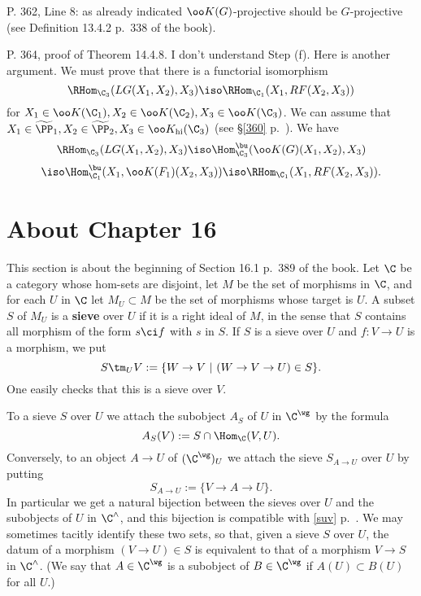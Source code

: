 \documentclass[12pt]{article}
\theoremstyle{remark}
\theoremstyle{definition}
\begin{document}
%

\begin{s}
P. 362, Line 8: as already indicated $\oo K(G)$-projective should be $G$-projective (see Definition 13.4.2 p.~338 of the book).
\end{s}

%

\begin{s}
P. 364, proof of Theorem 14.4.8. I don't understand Step (f). Here is another argument. We must prove that there is a functorial isomorphism
$$
\RHom_{\C_3}(LG(X_1,X_2),X_3)\iso\RHom_{\C_1}(X_1,RF(X_2,X_3))
$$ 
for $X_1\in\oo K(\C_1),X_2\in\oo K(\C_2),X_3\in\oo K(\C_3)$. We can assume that $X_1\in\widetilde\PP_1,X_2\in\widetilde\PP_2,X_3\in\oo K_{\text{hi}}(\C_3)$ (see \S\ref{360} p.~). We have 
$$
\RHom_{\C_3}(LG(X_1,X_2),X_3)\iso\Hom^\bu_{\C_3}(\oo K(G)(X_1,X_2),X_3)
$$ 
$$
\iso\Hom^\bu_{\C_1}(X_1,\oo K(F_1)(X_2,X_3))\iso\RHom_{\C_1}(X_1,RF(X_2,X_3)).
$$
\end{s}


\section{About Chapter 16}


This section is about the beginning of Section 16.1 p.~389 of the book. Let $\C$ be a category whose hom-sets are disjoint, let $M$ be the set of morphisms in $\C$, and for each $U$ in $\C$ let $M_U\subset M$ be the set of morphisms whose target is $U$. A subset $S$ of $M_U$ is a \textbf{sieve}  over $U$ if it is a right ideal of $M$, in the sense that $S$ contains all morphism of the form $s\ci f$ with $s$ in $S$. If $S$ is a sieve over $U$ and $f:V\to U$ is a morphism, we put
\begin{equation}\label{suv}
S\tm_UV:=\{W\to V\ |\ (W\to V\to U)\in S\}.
\end{equation}
One easily checks that this is a sieve over $V$. 

To a sieve $S$ over $U$ we attach the subobject $A_S$ of $U$ in $\C^\wg$ by the formula
$$
A_S(V):=S\cap\Hom_\C(V,U).
$$ 
Conversely, to an object $A\to U$ of $(\C^\wg)_U$ we attach the sieve $S_{A\to U}$ over $U$ by putting 
$$
S_{A\to U}:=\{V\to A\to U\}.
$$ 
In particular we get a natural bijection between the sieves over $U$ and the subobjects of $U$ in $\C^\wedge$, and this bijection is compatible with \eqref{suv} p.~\pageref{suv}. We may sometimes tacitly identify these two sets, so that, given a sieve $S$ over $U$, the datum of a morphism $(V\to U)\in S$ is equivalent to that of a morphism $V\to S$ in $\C^\wedge$. (We say that $A\in\C^\wg$ is a subobject of $B\in\C^\wg$ if $A(U)\subset B(U)$ for all $U$.)
\end{document}
